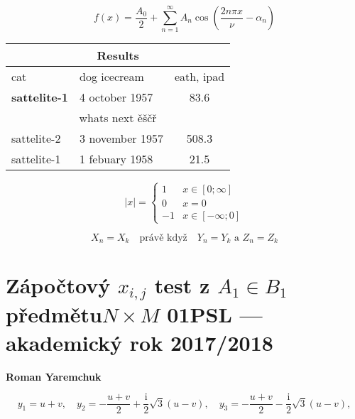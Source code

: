 \documentclass[OMG]{article}
\begin{document}
\begin{equation}
f(x) = \frac{A_0}{2} + \sum \limits_{n=1}^{\infty} A_n \cos \left( \frac{2 n \pi x}{\nu} - \alpha_n \right) 
\end{equation}
\begin{tabular}{  l  l  c  }
\midrule[\heavyrulewidth]
\multicolumn{3}{c}{\textbf{Results}} \\
\midrule[\heavyrulewidth]
cat & dog icecream & eath, ipad  \\ \hline
\textbf{sattelite-1} & 4 october 1957 & 83.6 \\ 

\multicolumn{3}{c}{whats next ěščř} \\

sattelite-2 & 3 november 1957 & 508.3  \\ 
sattelite-1 & 1 febuary 1958 & 21.5 \\
\midrule[\heavyrulewidth]
\end{tabular}
\begin{equation*}
|x| = 
\begin{cases}
	1 & x \in [ 0;\infty ] \\
	0 &	x = 0 \\
	-1 & x \in [-\infty; 0]
\end{cases}
\end{equation*}



\begin{equation}
X_n = X_k \quad \mbox{právě když} \quad Y_n = Y_k \text{ a } Z_n = Z_k
\end{equation}
\section*{Zápočtový $x_{i,j}$ test z $A_1 \in B_1 $ předmětu$N\times M$ 01PSL — akademický rok 2017/2018}
\textbf{Roman Yaremchuk}

\begin{equation}
    y_1=u+v, \quad y_2=-\frac{u+v}{2}+\frac{\mathrm{i}}{2}\sqrt{3}(u-v),
    \quad y_3=-\frac{u+v}{2}-\frac{\mathrm{i}}{2}\sqrt{3}(u-v),
\end{equation}
\end{document}
